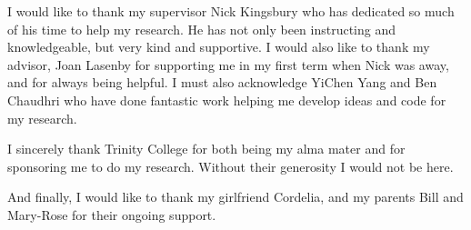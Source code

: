 
\begin{acknowledgements}      

  I would like to thank my supervisor Nick Kingsbury who has dedicated so
  much of his time to help my research. He has not only been instructing and
  knowledgeable, but very kind and supportive. I would also like to thank my
  advisor, Joan Lasenby for supporting me in my first term when Nick was away,
  and for always being helpful. I must also acknowledge
  YiChen Yang and Ben Chaudhri who have done fantastic work helping me develop
  ideas and code for my research.

  I sincerely thank Trinity College for both being my alma mater and
  for sponsoring me to do my research. Without their generosity I would not be
  here.

  And finally, I would like to thank my girlfriend Cordelia, and my parents
  Bill and Mary-Rose for their ongoing support.


\end{acknowledgements}
